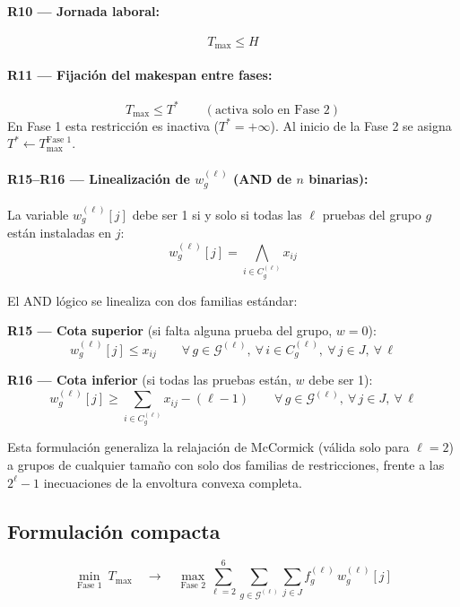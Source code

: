 \documentclass[12pt, a4paper]{article}
\begin{document}
\paragraph{R10 — Jornada laboral:}
\[
  T_{\max} \leq H
\]

\paragraph{R11 — Fijación del makespan entre fases:}
\[
  T_{\max} \leq T^* \qquad (\text{activa solo en Fase 2})
\]
En Fase 1 esta restricción es inactiva ($T^* = +\infty$). Al inicio de la Fase 2 se asigna
$T^* \leftarrow T_{\max}^{\text{Fase 1}}$.

\paragraph{R15--R16 — Linealización de $w_g^{(\ell)}$ (AND de $n$ binarias):}

La variable $w_g^{(\ell)}[j]$ debe ser 1 si y solo si todas las $\ell$ pruebas del grupo
$g$ están instaladas en $j$:
\[
  w_g^{(\ell)}[j] = \bigwedge_{i \in C_g^{(\ell)}} x_{ij}
\]

El AND lógico se linealiza con dos familias estándar:

\textbf{R15 — Cota superior} (si falta alguna prueba del grupo, $w = 0$):
\[
  w_g^{(\ell)}[j] \leq x_{ij}
  \qquad \forall\, g \in \mathcal{G}^{(\ell)},\ \forall\, i \in C_g^{(\ell)},\
  \forall\, j \in J,\ \forall\, \ell
\]

\textbf{R16 — Cota inferior} (si todas las pruebas están, $w$ debe ser 1):
\[
  w_g^{(\ell)}[j] \geq \sum_{i \in C_g^{(\ell)}} x_{ij} - (\ell - 1)
  \qquad \forall\, g \in \mathcal{G}^{(\ell)},\ \forall\, j \in J,\ \forall\, \ell
\]

Esta formulación generaliza la relajación de McCormick (válida solo para $\ell = 2$) a
grupos de cualquier tamaño con solo dos familias de restricciones, frente a las
$2^{\ell}-1$ inecuaciones de la envoltura convexa completa.

\subsection{Formulación compacta}

\[
  \underset{\text{Fase 1}}{\min}\ T_{\max}
  \quad \longrightarrow \quad
  \underset{\text{Fase 2}}{\max}
  \sum_{\ell=2}^{6}\sum_{g \in \mathcal{G}^{(\ell)}}\sum_{j\in J} f_g^{(\ell)}\,w_g^{(\ell)}[j]
\]
\end{document}
